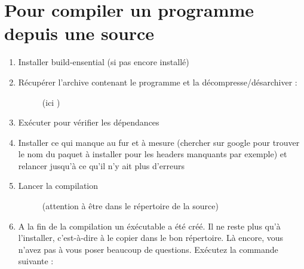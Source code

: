 \documentclass[letterpaper,10pt,french]{sphinxmanual}
\begin{document}
\section{Pour compiler un programme depuis une source}
\label{\detokenize{19-compiler:pour-compiler-un-programme-depuis-une-source}}\begin{enumerate}
\def\theenumi{\arabic{enumi}}
\def\labelenumi{\theenumi .}
\makeatletter\def\p@enumii{\p@enumi \theenumi .}\makeatother
\item {} \begin{description}
\item[{Installer build-ensential (si pas encore installé)}] \leavevmode
{}

\end{description}

\item {} \begin{description}
\item[{Récupérer l’archive contenant le programme et la décompresse/désarchiver :}] \leavevmode
{} (ici )

\end{description}

\item {} \begin{description}
\item[{Exécuter  pour vérifier les dépendances}] \leavevmode
{}

\end{description}

\item {} 
Installer ce qui manque au fur et à mesure (chercher sur google pour trouver le nom du paquet à installer pour les headers manquants par exemple) et relancer  jusqu’à ce qu’il n’y ait plus d’erreurs

\item {} \begin{description}
\item[{Lancer la compilation}] \leavevmode
{} (attention à être dans le répertoire de la source)

\end{description}

\item {} \begin{description}
\item[{A la fin de la compilation un éxécutable a été créé. Il ne reste plus qu’à l’installer, c’est-à-dire à le copier dans le bon répertoire. Là encore, vous n’avez pas à vous poser beaucoup de questions. Exécutez la commande suivante :}] \leavevmode
{}


\end{description}
\end{enumerate}
\end{document}

